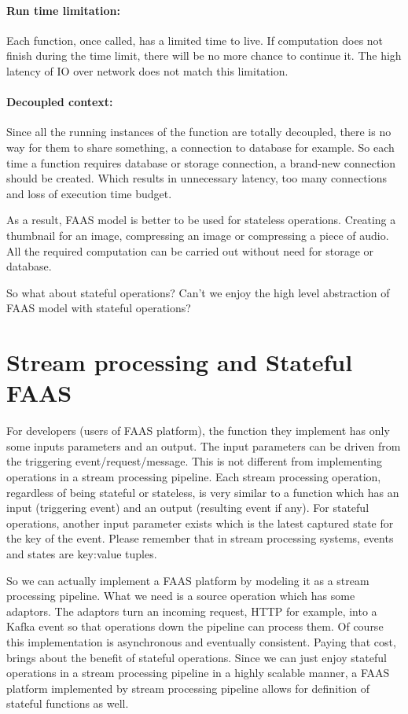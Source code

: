 \documentclass[a4]{report}
\begin{document}
    \paragraph{Run time limitation:} Each function, once called, has a limited time to live.
    If computation does not finish during the time limit, there will be no more chance to continue it.
    The high latency of IO over network does not match this limitation.

    \paragraph{Decoupled context:} Since all the running instances of the function are totally decoupled, there is
    no way for them to share something, a connection to database for example.
    So each time a function requires database or storage connection, a brand-new connection should be created.
    Which results in unnecessary latency, too many connections and loss of execution time budget.

    As a result, FAAS model is better to be used for stateless operations.
    Creating a thumbnail for an image, compressing an image or compressing a piece of audio.
    All the required computation can be carried out without need for storage or database.

    So what about stateful operations?
    Can't we enjoy the high level abstraction of FAAS model with stateful operations?


    \section{Stream processing and Stateful FAAS}
    For developers (users of FAAS platform), the function they implement has only some inputs parameters and an output.
    The input parameters can be driven from the triggering event/request/message.
    This is not different from implementing operations in a stream processing pipeline.
    Each stream processing operation, regardless of being stateful or stateless, is very similar to a function which
    has an input (triggering event) and an output (resulting event if any).
    For stateful operations, another input parameter exists which is the latest captured state for the key of the event.
    Please remember that in stream processing systems, events and states are key:value tuples.

    So we can actually implement a FAAS platform by modeling it as a stream processing pipeline.
    What we need is a source operation which has some adaptors.
    The adaptors turn an incoming request, HTTP for example, into a Kafka event so that operations down the pipeline
    can process them.
    Of course this implementation is asynchronous and eventually consistent.
    Paying that cost, brings about the benefit of stateful operations.
    Since we can just enjoy stateful operations in a stream processing pipeline in a highly scalable manner,
    a FAAS platform implemented by stream processing pipeline allows for definition of stateful functions as well.
\end{document}
